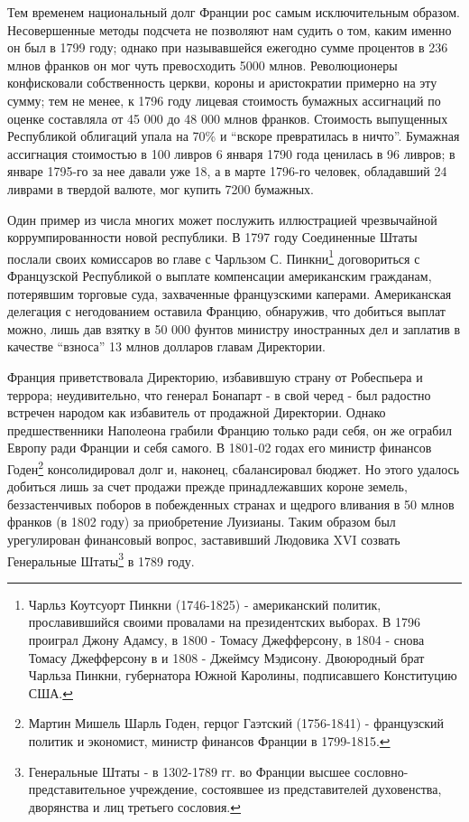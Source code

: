 \documentclass[
  oneside,
  12pt,
  titlepage]{book}
\begin{document}
Тем временем национальный долг Франции рос самым исключительным образом. Несовершенные методы подсчета не позволяют нам судить о том, каким именно он был в 1799 году; однако при называвшейся ежегодно сумме процентов в 236 млнов франков он мог чуть превосходить 5000 млнов. Революционеры конфисковали собственность церкви, короны и аристократии примерно на эту сумму; тем не менее, к 1796 году лицевая стоимость бумажных ассигнаций по оценке составляла от 45 000 до 48 000 млнов франков. Стоимость выпущенных Республикой облигаций упала на 70\% и ``вскоре превратилась в ничто''. Бумажная ассигнация стоимостью в 100 ливров 6 января 1790 года ценилась в 96 ливров; в январе 1795-го за нее давали уже 18, а в марте 1796-го человек, обладавший 24 ливрами в твердой валюте, мог купить 7200 бумажных.

Один пример из числа многих может послужить иллюстрацией чрезвычайной коррумпированности новой республики. В 1797 году Соединенные Штаты послали своих комиссаров во главе с Чарльзом С. Пинкни\footnote{Чарльз Коутсуорт Пинкни (1746-1825) - американский политик, прославившийся своими провалами на президентских выборах. В 1796 проиграл Джону Адамсу, в 1800 - Томасу Джефферсону, в 1804 - снова Томасу Джефферсону в и 1808 - Джеймсу Мэдисону. Двоюродный брат Чарльза Пинкни, губернатора Южной Каролины, подписавшего Конституцию США.} договориться с Французской Республикой о выплате компенсации американским гражданам, потерявшим торговые суда, захваченные французскими каперами. Американская делегация с негодованием оставила Францию, обнаружив, что добиться выплат можно, лишь дав взятку в 50 000 фунтов министру иностранных дел и заплатив в качестве ``взноса'' 13 млнов долларов главам Директории.

Франция приветствовала Директорию, избавившую страну от Робеспьера и террора; неудивительно, что генерал Бонапарт - в свой черед - был радостно встречен народом как избавитель от продажной Директории. Однако предшественники Наполеона грабили Францию только ради себя, он же ограбил Европу ради Франции и себя самого. В 1801-02 годах его министр финансов Годен\footnote{Мартин Мишель Шарль Годен, герцог Гаэтский (1756-1841) - французский политик и экономист, министр финансов Франции в 1799-1815.} консолидировал долг и, наконец, сбалансировал бюджет. Но этого удалось добиться лишь за счет продажи прежде принадлежавших короне земель, беззастенчивых поборов в побежденных странах и щедрого вливания в 50 млнов франков (в 1802 году) за приобретение Луизианы. Таким образом был урегулирован финансовый вопрос, заставивший Людовика XVI созвать Генеральные Штаты\footnote{Генеральные Штаты - в 1302-1789 гг. во Франции высшее сословно-представительное учреждение, состоявшее из представителей духовенства, дворянства и лиц третьего сословия.} в 1789 году.
\end{document}
